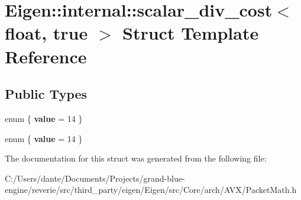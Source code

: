\hypertarget{struct_eigen_1_1internal_1_1scalar__div__cost_3_01float_00_01true_01_4}{}\section{Eigen\+::internal\+::scalar\+\_\+div\+\_\+cost$<$ float, true $>$ Struct Template Reference}
\label{struct_eigen_1_1internal_1_1scalar__div__cost_3_01float_00_01true_01_4}
\subsection*{Public Types}
\begin{DoxyCompactItemize}
\item 
\mbox{\label{struct_eigen_1_1internal_1_1scalar__div__cost_3_01float_00_01true_01_4_af996c6b880cc8aef5e2bf55706558c25}} 
enum \{ {\bfseries value} = 14
 \}
\item 
\mbox{\label{struct_eigen_1_1internal_1_1scalar__div__cost_3_01float_00_01true_01_4_a342aaf336caafb9583cdb8d8d55b2a3b}} 
enum \{ {\bfseries value} = 14
 \}
\end{DoxyCompactItemize}


The documentation for this struct was generated from the following file\+:\begin{DoxyCompactItemize}
\item 
C\+:/\+Users/dante/\+Documents/\+Projects/grand-\/blue-\/engine/reverie/src/third\+\_\+party/eigen/\+Eigen/src/\+Core/arch/\+A\+V\+X/Packet\+Math.\+h\end{DoxyCompactItemize}
